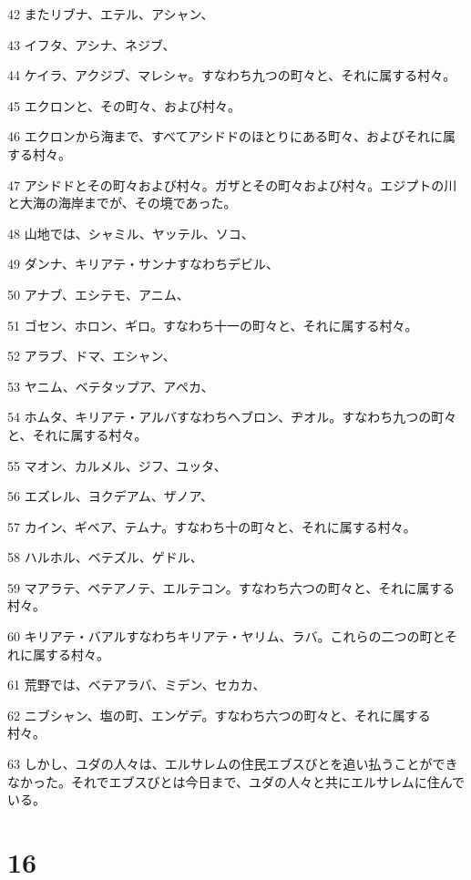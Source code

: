 \par 42 またリブナ、エテル、アシャン、
\par 43 イフタ、アシナ、ネジブ、
\par 44 ケイラ、アクジブ、マレシャ。すなわち九つの町々と、それに属する村々。
\par 45 エクロンと、その町々、および村々。
\par 46 エクロンから海まで、すべてアシドドのほとりにある町々、およびそれに属する村々。
\par 47 アシドドとその町々および村々。ガザとその町々および村々。エジプトの川と大海の海岸までが、その境であった。
\par 48 山地では、シャミル、ヤッテル、ソコ、
\par 49 ダンナ、キリアテ・サンナすなわちデビル、
\par 50 アナブ、エシテモ、アニム、
\par 51 ゴセン、ホロン、ギロ。すなわち十一の町々と、それに属する村々。
\par 52 アラブ、ドマ、エシャン、
\par 53 ヤニム、ベテタップア、アペカ、
\par 54 ホムタ、キリアテ・アルバすなわちヘブロン、ヂオル。すなわち九つの町々と、それに属する村々。
\par 55 マオン、カルメル、ジフ、ユッタ、
\par 56 エズレル、ヨクデアム、ザノア、
\par 57 カイン、ギベア、テムナ。すなわち十の町々と、それに属する村々。
\par 58 ハルホル、ベテズル、ゲドル、
\par 59 マアラテ、ベテアノテ、エルテコン。すなわち六つの町々と、それに属する村々。
\par 60 キリアテ・バアルすなわちキリアテ・ヤリム、ラバ。これらの二つの町とそれに属する村々。
\par 61 荒野では、ベテアラバ、ミデン、セカカ、
\par 62 ニブシャン、塩の町、エンゲデ。すなわち六つの町々と、それに属する村々。
\par 63 しかし、ユダの人々は、エルサレムの住民エブスびとを追い払うことができなかった。それでエブスびとは今日まで、ユダの人々と共にエルサレムに住んでいる。

\chapter{16}

